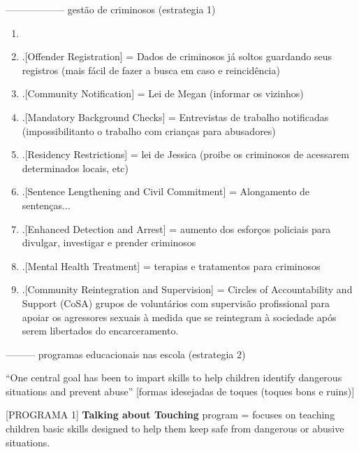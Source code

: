 ------------------  gestão de criminosos (estrategia 1)

\begin{enumerate}
  \item \cite{finkelhor2009prevention}

\item .[Offender Registration] = Dados de criminosos já soltos guardando seus registros (mais fácil de fazer a busca em caso e reincidência)

\item .[Community Notification] = Lei de Megan (informar os vizinhos)

\item .[Mandatory Background Checks] = Entrevistas de trabalho notificadas (impossibilitanto o trabalho com crianças para abusadores)

\item .[Residency Restrictions] = lei de Jessica (proibe os criminosos de acessarem determinados locais, etc)

\item .[Sentence Lengthening and Civil Commitment] = Alongamento de sentenças...

\item .[Enhanced Detection and Arrest] = aumento dos esforços policiais para divulgar, investigar e prender criminosos

\item .[Mental Health Treatment] = terapias e tratamentos para criminosos

\item .[Community Reintegration and Supervision] = Circles of Accountability and Support (CoSA) grupos de voluntários com supervisão profissional para apoiar os agressores sexuais à medida que se reintegram à sociedade após serem libertados do encarceramento.
\end{enumerate}

--------- programas educacionais nas escola (estrategia 2)

``One central goal has been to impart skills to help children identify dangerous situations and prevent abuse'' \cite{finkelhor2009prevention} [formas idesejadas de toques (toques bons e ruins)]


[PROGRAMA 1] \textbf{Talking about Touching} program =  focuses on teaching children basic skills designed to help them keep safe from dangerous or abusive situations. \cite{finkelhor2009prevention} %


